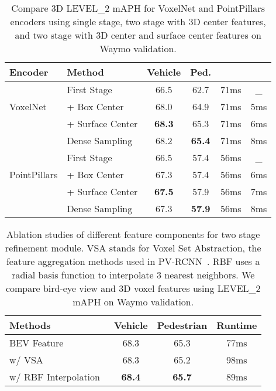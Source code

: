 \documentclass[final]{cvpr}
\begin{document}
\begin{table}[t]
\small
\vspace{-2mm}
\begin{center}
\begin{tabular}{@{}l@{\ }l@{\ }c@{\ \ }c@{\ }c@{\ }c@{}}
  \toprule
   Encoder & Method & Vehicle & Ped. &  &  \\
  \midrule
    \multirow{3}{5em}{VoxelNet}
   & First Stage & 66.5 & 62.7 & 71ms & \_ \\
   & + Box Center & 68.0 & 64.9 & 71ms & 5ms  \\
   & + Surface Center & \textbf{68.3} & 65.3 & 71ms & 6ms  \\ 
   & Dense Sampling & 68.2 & \textbf{65.4}  & 71ms & 8ms \\ 
   \midrule
    \multirow{3}{5em}{PointPillars}
   & First Stage & 66.5 & 57.4 & 56ms & \_ \\
   & + Box Center & 67.3 & 57.4 & 56ms & 6ms  \\
   & + Surface Center & \textbf{67.5} & 57.9 & 56ms & 7ms  \\ 
   & Dense Sampling & 67.3 & \textbf{57.9} & 56ms & 8ms  \\ 
   \bottomrule

\end{tabular}
\end{center}
\vspace{-5mm}
\caption{Compare 3D LEVEL\_2 mAPH for VoxelNet and PointPillars encoders using single stage, two stage with 3D center features, and two stage with 3D center and surface center features on Waymo validation. 
}
\end{table}

\begin{table}[t]
\small
\begin{center}
\begin{tabular}{@{}l@{\ \ }c@{\ \ }c@{\ \ }c@{}}
  \toprule
   Methods & Vehicle & Pedestrian  & Runtime \\
  \midrule
  BEV Feature  & 68.3 & 65.3 & 77ms  \\ 
  w/ VSA~\cite{pvrcnn} & 68.3 & 65.2 &  98ms \\ 
  w/ RBF Interpolation~\cite{sassd, qi2017pointnet++} & \textbf{68.4} & \textbf{65.7} & 89ms  \\ 
  \bottomrule
\end{tabular}
\end{center}
\vspace{-5mm}
\caption{ Ablation studies of different feature components for two stage refinement module. VSA stands for Voxel Set Abstraction, the feature aggregation methods used in PV-RCNN~\cite{pvrcnn}. RBF uses a radial basis function to interpolate 3 nearest neighbors. We compare bird-eye view and 3D voxel features using LEVEL\_2 mAPH on Waymo validation. 
}
\vspace{-3mm}
\end{table}
\end{document}
